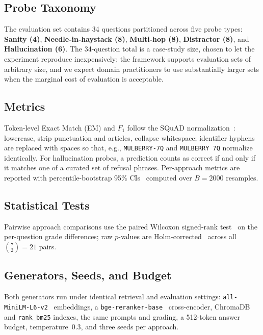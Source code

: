 \documentclass[conference,a4paper,10pt]{IEEEtran}
\begin{document}
\subsection{Probe Taxonomy}
\label{sec:probes}

The evaluation set contains 34 questions partitioned across five probe types: \textbf{Sanity (4)}, \textbf{Needle-in-haystack (8)}, \textbf{Multi-hop (8)}, \textbf{Distractor (8)}, and \textbf{Hallucination (6)}.
The 34-question total is a case-study size, chosen to let the experiment reproduce inexpensively; the framework supports evaluation sets of arbitrary size, and we expect domain practitioners to use substantially larger sets when the marginal cost of evaluation is acceptable.

\subsection{Metrics}
\label{sec:metrics}
Token-level Exact Match (EM) and $F_1$ follow the SQuAD normalization~\cite{rajpurkar2016squad}: lowercase, strip punctuation and articles, collapse whitespace; identifier hyphens are replaced with spaces so that, e.g., \texttt{MULBERRY-7Q} and \texttt{MULBERRY 7Q} normalize identically.
For hallucination probes, a prediction counts as correct if and only if it matches one of a curated set of refusal phrases.
Per-approach metrics are reported with percentile-bootstrap 95\% CIs~\cite{efron1979bootstrap} computed over $B = 2000$ resamples.

\subsection{Statistical Tests}
\label{sec:stats}
Pairwise approach comparisons use the paired Wilcoxon signed-rank test~\cite{wilcoxon1945} on the per-question grade differences; raw $p$-values are Holm-corrected~\cite{holm1979} across all $\binom{7}{2}=21$ pairs.

\subsection{Generators, Seeds, and Budget}
\label{sec:execution}
Both generators run under identical retrieval and evaluation settings: \texttt{all-MiniLM-L6-v2}~\cite{reimers2019sbert} embeddings, a \texttt{bge-reranker-base}~\cite{xiao2023cpack} cross-encoder, ChromaDB and \texttt{rank\_bm25} indexes, the same prompts and grading, a 512-token answer budget, temperature~$0.3$, and three seeds per approach.
\end{document}

